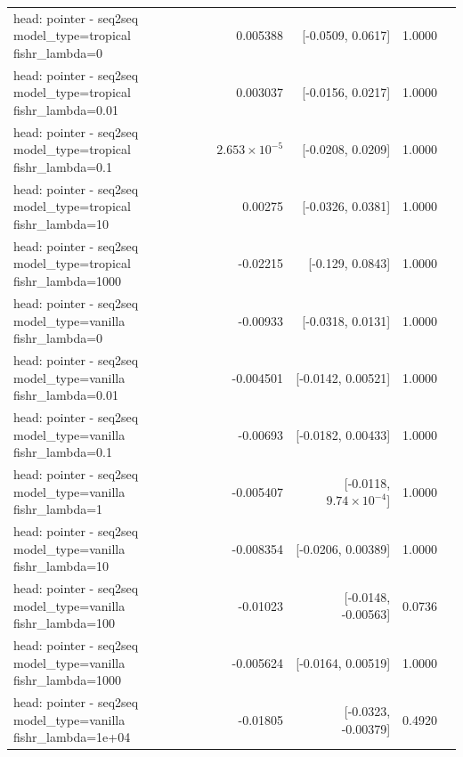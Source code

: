 \documentclass[10pt]{article}
\makeatletter
\newcommand{\stackcell}[1]{\begin{tabular}[t]{@{}l@{}}#1\end{tabular}}
\makeatother
\begin{document}
{\begin{longtable}{lrrrl}
\stackcell{head: pointer - seq2seq\\\footnotesize model\_type=tropical fishr\_lambda=0 } & 0.005388 & [-0.0509, 0.0617] & 1.0000 & \\
\stackcell{head: pointer - seq2seq\\\footnotesize model\_type=tropical fishr\_lambda=0.01 } & 0.003037 & [-0.0156, 0.0217] & 1.0000 & \\
\stackcell{head: pointer - seq2seq\\\footnotesize model\_type=tropical fishr\_lambda=0.1 } & $2.653\times10^{-5}$ & [-0.0208, 0.0209] & 1.0000 & \\
\stackcell{head: pointer - seq2seq\\\footnotesize model\_type=tropical fishr\_lambda=10 } & 0.00275 & [-0.0326, 0.0381] & 1.0000 & \\
\stackcell{head: pointer - seq2seq\\\footnotesize model\_type=tropical fishr\_lambda=1000 } & -0.02215 & [-0.129, 0.0843] & 1.0000 & \\
\stackcell{head: pointer - seq2seq\\\footnotesize model\_type=vanilla fishr\_lambda=0 } & -0.00933 & [-0.0318, 0.0131] & 1.0000 & \\
\stackcell{head: pointer - seq2seq\\\footnotesize model\_type=vanilla fishr\_lambda=0.01 } & -0.004501 & [-0.0142, 0.00521] & 1.0000 & \\
\stackcell{head: pointer - seq2seq\\\footnotesize model\_type=vanilla fishr\_lambda=0.1 } & -0.00693 & [-0.0182, 0.00433] & 1.0000 & \\
\stackcell{head: pointer - seq2seq\\\footnotesize model\_type=vanilla fishr\_lambda=1 } & -0.005407 & [-0.0118, $9.74\times10^{-4}$] & 1.0000 & \\
\stackcell{head: pointer - seq2seq\\\footnotesize model\_type=vanilla fishr\_lambda=10 } & -0.008354 & [-0.0206, 0.00389] & 1.0000 & \\
\stackcell{head: pointer - seq2seq\\\footnotesize model\_type=vanilla fishr\_lambda=100 } & -0.01023 & [-0.0148, -0.00563] & 0.0736 & \\
\stackcell{head: pointer - seq2seq\\\footnotesize model\_type=vanilla fishr\_lambda=1000 } & -0.005624 & [-0.0164, 0.00519] & 1.0000 & \\
\stackcell{head: pointer - seq2seq\\\footnotesize model\_type=vanilla fishr\_lambda=1e+04 } & -0.01805 & [-0.0323, -0.00379] & 0.4920 & \\
\bottomrule
\end{longtable}
}
\end{document}
